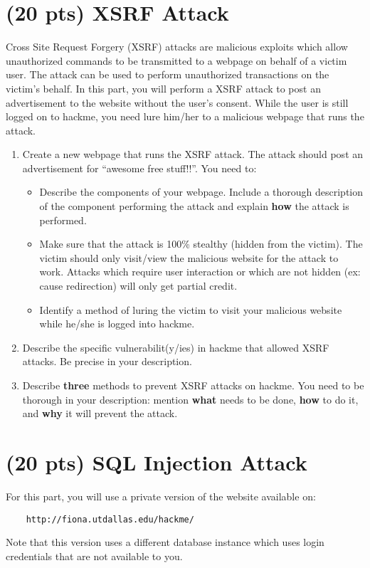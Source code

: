 \documentclass[]{article}
\begin{document}
\section{(20 pts) XSRF Attack}

Cross Site Request Forgery (XSRF) attacks are malicious exploits which allow unauthorized commands to be transmitted to a webpage on behalf of a victim user. The attack can be used to perform unauthorized transactions on the victim's behalf. In this part, you will perform a XSRF attack to post an advertisement to the website without the user's consent. While the user is still logged on to hackme, you need lure him/her to a malicious webpage that runs the attack.

\begin{enumerate}
	\item Create a new webpage that runs the XSRF attack. The attack should post an advertisement for ``awesome free stuff!!''. You need to:
		\begin{itemize}
			\item Describe the components of your webpage. Include a thorough description of the component performing the attack and explain \textbf{how} the attack is performed.
			\item Make sure that the attack is 100\% stealthy (hidden from the victim). The victim should only visit/view the malicious website for the attack to work. Attacks which require user interaction or which are not hidden (ex: cause redirection) will only get partial credit.
			\item Identify a method of luring the victim to visit your malicious website while he/she is logged into hackme.
		\end{itemize}
	\item Describe the specific vulnerabilit(y/ies) in hackme that allowed XSRF attacks. Be precise in your description.
	\item Describe \textbf{three} methods to prevent XSRF attacks on hackme. You need to be thorough in your description: mention \textbf{what} needs to be done, \textbf{how} to do it, and \textbf{why} it will prevent the attack.
\end{enumerate}


\section{(20 pts) SQL Injection Attack}

For this part, you will use a private version of the website available on:
\begin{verbatim}
	http://fiona.utdallas.edu/hackme/
\end{verbatim}
Note that this version uses a different database instance which uses login credentials that are not available to you.
\end{document}
